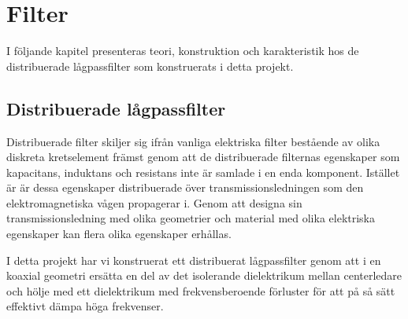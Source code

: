 \documentclass[main.tex]{subfiles}
\begin{document}
\chapter{Filter}
\label{ch:filter}
I följande kapitel presenteras teori, konstruktion och karakteristik hos de distribuerade lågpassfilter som konstruerats i detta projekt.



\section{Distribuerade lågpassfilter}
Distribuerade filter skiljer sig ifrån vanliga elektriska filter bestående av olika diskreta kretselement främst genom att de distribuerade filternas egenskaper som kapacitans, induktans och resistans inte är samlade i en enda komponent. Istället är är dessa egenskaper distribuerade över transmissionsledningen som den elektromagnetiska vågen propagerar i. Genom att designa sin transmissionsledning med olika geometrier och material med olika elektriska egenskaper kan flera olika egenskaper erhållas\autocite{cheng}. 

I detta projekt har vi konstruerat ett distribuerat lågpassfilter genom att i en koaxial geometri ersätta en del av det isolerande dielektrikum mellan centerledare och hölje med ett dielektrikum med frekvensberoende förluster för att på så sätt effektivt dämpa höga frekvenser.  
\end{document}
